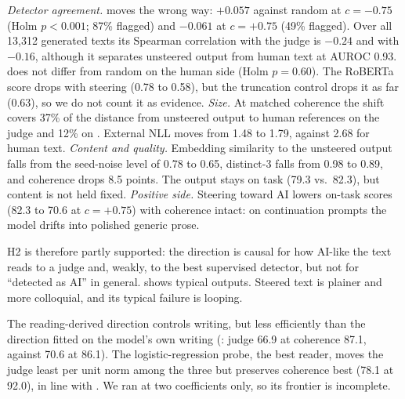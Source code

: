 {\em Detector agreement.} \bino moves the wrong way: $+0.057$ against random at $c=-0.75$ (Holm $p<0.001$; 87\% flagged) and $-0.061$ at $c=+0.75$ (49\% flagged).
Over all 13{,}312 generated texts its Spearman correlation with the judge is $-0.24$ and with \desklib $-0.16$, although it separates unsteered output from human text at AUROC 0.93.
\radar does not differ from random on the human side (Holm $p = 0.60$).
The \hcthree RoBERTa score drops with steering (0.78 to 0.58), but the truncation control drops it as far (0.63), so we do not count it as evidence.
{\em Size.} At matched coherence the shift covers 37\% of the distance from unsteered output to human references on the judge and 12\% on \desklib. External NLL moves from 1.48 to 1.79, against 2.68 for human text.
{\em Content and quality.} Embedding similarity to the unsteered output falls from the seed-noise level of 0.78 to 0.65, distinct-3 falls from 0.98 to 0.89, and coherence drops 8.5 points. The output stays on task (79.3 vs.\ 82.3), but content is not held fixed.
{\em Positive side.} Steering toward AI lowers on-task scores (82.3 to 70.6 at $c=+0.75$) with coherence intact: on continuation prompts the model drifts into polished generic prose.

H2 is therefore partly supported: the direction is causal for how AI-like the text reads to a judge and, weakly, to the best supervised detector, but not for ``detected as AI'' in general.
 shows typical outputs. Steered text is plainer and more colloquial, and its typical failure is looping.

The reading-derived direction controls writing, but less efficiently than the direction fitted on the model's own writing (\writechat: judge 66.9 at coherence 87.1, against 70.6 at 86.1).
The logistic-regression probe, the best reader, moves the judge least per unit norm among the three but preserves coherence best (78.1 at 92.0), in line with \citet{marks2023geometry}. We ran \ailr at two coefficients only, so its frontier is incomplete.

